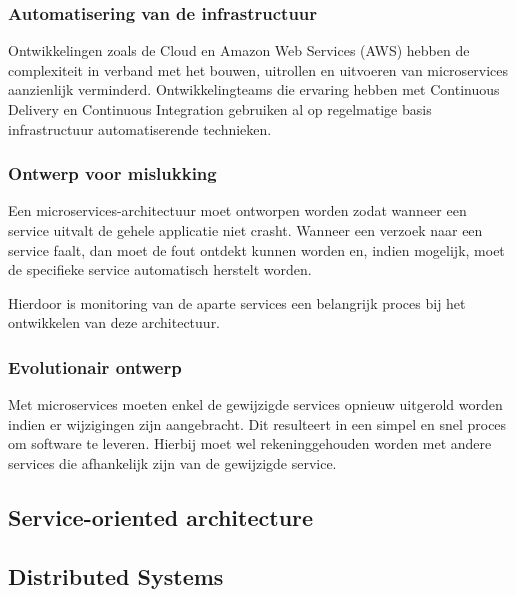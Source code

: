 \subsubsection{Automatisering van de infrastructuur}

Ontwikkelingen zoals de Cloud en Amazon Web Services (AWS) hebben de complexiteit in verband met het bouwen, uitrollen en uitvoeren van microservices aanzienlijk verminderd. Ontwikkelingteams die ervaring hebben met Continuous Delivery en Continuous Integration gebruiken al op regelmatige basis infrastructuur automatiserende technieken.

\subsubsection{Ontwerp voor mislukking}

Een microservices-architectuur moet ontworpen worden zodat wanneer een service uitvalt de gehele applicatie niet crasht. Wanneer een verzoek naar een service faalt, dan moet de fout ontdekt kunnen worden en, indien mogelijk, moet de specifieke service automatisch herstelt worden.

Hierdoor is monitoring van de aparte services een belangrijk proces bij het ontwikkelen van deze architectuur.

\subsubsection{Evolutionair ontwerp}

Met microservices moeten enkel de gewijzigde services opnieuw uitgerold worden indien er wijzigingen zijn aangebracht. Dit resulteert in een simpel en snel proces om software te leveren. Hierbij moet wel rekeninggehouden worden met andere services die afhankelijk zijn van de gewijzigde service.

\subsection{Service-oriented architecture}
\label{sec:soa}

\subsection{Distributed Systems}


